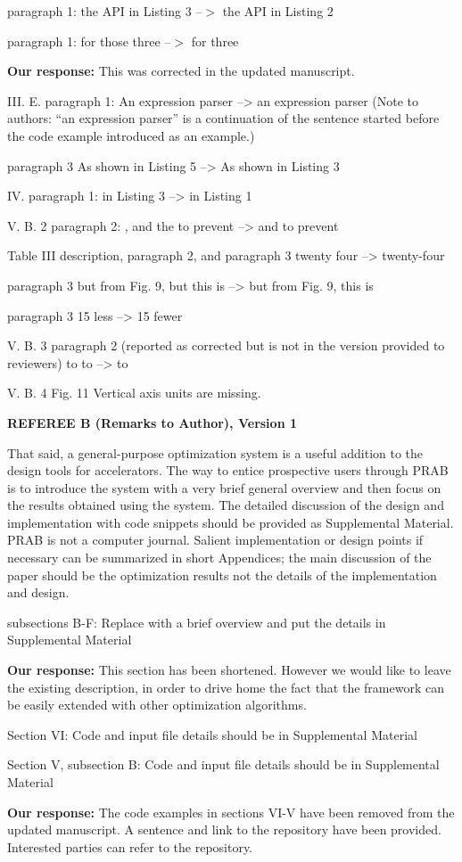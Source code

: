 \documentclass{article}
\begin{document}
paragraph 1: the API in Listing 3 --$>$ the API in Listing 2

paragraph 1: for those three --$>$ for three

{\bf Our response:} {\color{blue} This was corrected in the updated manuscript.}

III. E. paragraph 1:
An expression parser --> an expression parser
(Note to authors: ``an expression parser'' is a continuation of the
sentence started before the code example introduced as an example.)

paragraph 3
As shown in Listing 5 --> As shown in Listing 3

IV. paragraph 1:
in Listing 3 --> in Listing 1

V. B. 2 paragraph 2:
, and the to prevent --> and to prevent

Table III description, paragraph 2, and paragraph 3
twenty four --> twenty-four

paragraph 3
but from Fig. 9, but this is --> but from Fig. 9, this is

paragraph 3
15 less --> 15 fewer

V. B. 3
paragraph 2 (reported as corrected but is not in the version provided
to reviewers)
to to --> to

V. B. 4
Fig. 11 Vertical axis units are missing.




{\bf REFEREE B (Remarks to Author), Version 1}

\vspace{1em}
That said, a general-purpose optimization system is a useful addition
to the design tools for accelerators. The way to entice prospective
users through PRAB is to introduce the system with a very brief
general overview and then focus on the results obtained using the
system. The detailed discussion of the design and implementation with
code snippets should be provided as Supplemental Material. PRAB is not
a computer journal. Salient implementation or design points if
necessary can be summarized in short Appendices; the main discussion
of the paper should be the optimization results not the details of the
implementation and design. 

subsections B-F:
Replace with a brief overview and put the details in Supplemental
Material

{\bf Our response: } {\color{blue} This section has been shortened. However we would like to 
leave the existing description, in order to drive home the fact that the framework can be 
easily extended with other optimization algorithms.}

Section VI: 
Code and input file details should be in Supplemental Material

Section V, subsection B:
Code and input file details should be in Supplemental Material

{\bf Our response:} {\color{blue} The code examples in sections VI-V have been removed from the updated manuscript. 
	A sentence and link to the repository have been provided. Interested parties can refer to the repository.}



 
\end{document}
